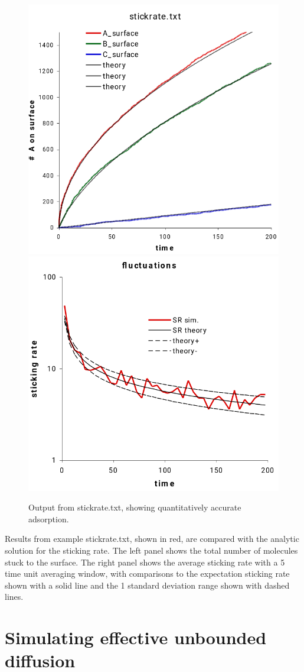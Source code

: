 \documentclass {book}
\begin{document}
\begin{figure}[h]
\centering
\includegraphics[height=5 cm]{figures/image21}
\includegraphics[height=5 cm]{figures/image22}
\caption{Output from stickrate.txt, showing quantitatively accurate adsorption.}
\label{fig:stickrate}
\end{figure}

Results from example stickrate.txt, shown in red, are compared with the analytic solution for the sticking rate. The left panel shows the total number of molecules stuck to the surface. The right panel shows the average sticking rate with a 5 time unit averaging window, with comparisons to the expectation sticking rate shown with a solid line and the 1 standard deviation range shown with dashed lines.

\section{Simulating effective unbounded diffusion}
\end{document}
